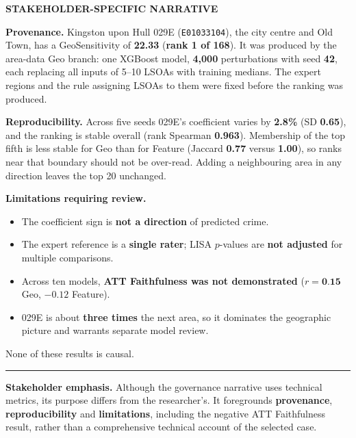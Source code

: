 \begin{tcolorbox}
\begin{minipage}[t]{0.55\linewidth}
{\scriptsize\bfseries STAKEHOLDER-SPECIFIC NARRATIVE}

\vspace{0.8mm}

\footnotesize
\RaggedRight

\textbf{Provenance.} Kingston upon Hull 029E (\texttt{E01033104}), the city
centre and Old Town, has a GeoSensitivity of \textbf{22.33}
(\textbf{rank 1 of 168}). It was produced by the area-data Geo branch: one
XGBoost model, \textbf{4,000} perturbations with seed \textbf{42}, each
replacing all inputs of 5--10 LSOAs with training medians. The expert
regions and the rule assigning LSOAs to them were fixed before the ranking
was produced.

\vspace{1.2mm}

\textbf{Reproducibility.} Across five seeds 029E's coefficient varies by
\textbf{2.8\%} (SD \textbf{0.65}), and the ranking is stable overall (rank
Spearman \textbf{0.963}). Membership of the top fifth is less stable for Geo
than for Feature (Jaccard \textbf{0.77} versus \textbf{1.00}), so ranks near
that boundary should not be over-read. Adding a neighbouring area in any
direction leaves the top 20 unchanged.

\vspace{1.2mm}

\textbf{Limitations requiring review.}
\begin{itemize}[leftmargin=*, itemsep=0pt, topsep=1pt]
\item The coefficient sign is \textbf{not a direction} of predicted crime.
\item The expert reference is a \textbf{single rater}; LISA $p$-values are
\textbf{not adjusted} for multiple comparisons.
\item Across ten models, \textbf{ATT Faithfulness was not demonstrated}
($r=\textbf{0.15}$ Geo, \textbf{$-0.12$} Feature).
\item 029E is about \textbf{three times} the next area, so it dominates the
geographic picture and warrants separate model review.
\end{itemize}

\vspace{0.8mm}

None of these results is causal.

\end{minipage}

\vspace{2mm}
\hrule
\vspace{1mm}

{\scriptsize
\textbf{Stakeholder emphasis.}
Although the governance narrative uses technical metrics, its purpose differs
from the researcher's. It foregrounds \textbf{provenance},
\textbf{reproducibility} and \textbf{limitations}, including the negative
ATT Faithfulness result, rather than a comprehensive technical account of
the selected case.
}

\end{tcolorbox}
